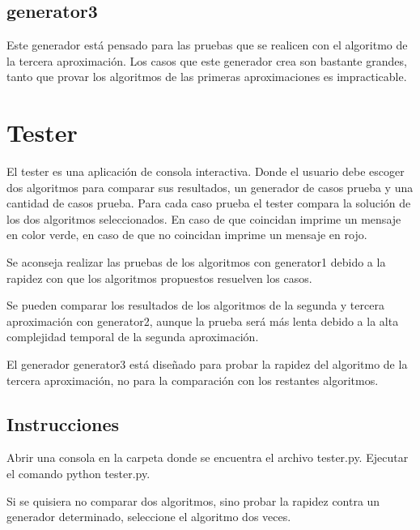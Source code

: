 \documentclass[article]{llncs}
\begin{document}
\subsection{generator3}
Este generador est\'a pensado para las pruebas que se realicen con el 
algoritmo de la tercera aproximaci\'on. Los casos que este generador 
crea son bastante grandes, tanto que provar los algoritmos de las primeras 
aproximaciones es impracticable.

\section{Tester}

El tester es una aplicaci\'on de consola interactiva. Donde el usuario 
debe escoger dos algoritmos para comparar sus resultados, un generador 
de casos prueba y una cantidad de casos prueba. Para cada caso prueba 
el tester compara la soluci\'on de los dos algoritmos seleccionados. 
En caso de que coincidan imprime un mensaje en color verde, en caso 
de que no coincidan imprime un mensaje en rojo.

Se aconseja realizar las pruebas de los algoritmos con generator1 debido 
a la rapidez con que los algoritmos propuestos resuelven los casos.

Se pueden comparar los resultados de los algoritmos de la segunda y 
tercera aproximaci\'on con generator2, aunque la prueba ser\'a m\'as 
lenta debido a la alta complejidad temporal de la segunda aproximaci\'on.

El generador generator3 est\'a dise\~{n}ado para probar la rapidez del 
algoritmo de la tercera aproximaci\'on, no para la comparaci\'on con los 
restantes algoritmos.

\subsection{Instrucciones}

Abrir una consola en la carpeta donde se encuentra el archivo tester.py. 
Ejecutar el comando python tester.py.

Si se quisiera no comparar dos algoritmos, sino probar la rapidez contra un 
generador determinado, seleccione el algoritmo dos veces.
\end{document}
